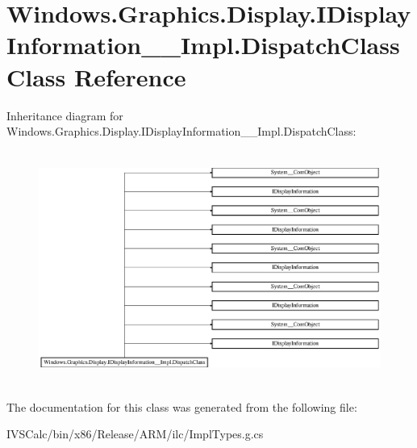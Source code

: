 \hypertarget{class_windows_1_1_graphics_1_1_display_1_1_i_display_information_____impl_1_1_dispatch_class}{}\section{Windows.\+Graphics.\+Display.\+I\+Display\+Information\+\_\+\+\_\+\+Impl.\+Dispatch\+Class Class Reference}
\label{class_windows_1_1_graphics_1_1_display_1_1_i_display_information_____impl_1_1_dispatch_class}
Inheritance diagram for Windows.\+Graphics.\+Display.\+I\+Display\+Information\+\_\+\+\_\+\+Impl.\+Dispatch\+Class\+:\begin{figure}[H]
\begin{center}
\leavevmode
\includegraphics[height=7.661692cm]{class_windows_1_1_graphics_1_1_display_1_1_i_display_information_____impl_1_1_dispatch_class}
\end{center}
\end{figure}


The documentation for this class was generated from the following file\+:\begin{DoxyCompactItemize}
\item 
I\+V\+S\+Calc/bin/x86/\+Release/\+A\+R\+M/ilc/Impl\+Types.\+g.\+cs\end{DoxyCompactItemize}
